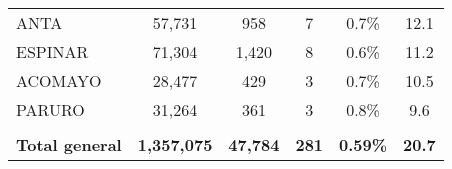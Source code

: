 \begin{tabular}{lccccc}
	\cellcolor[HTML]{FFFF99}ANTA                                    & 57,731               & 958                                  & 7                    & 0.7\%                      & 12.1                                        \\
	\cellcolor[HTML]{FFFF99}ESPINAR                                 & 71,304               & 1,420                                & 8                    & 0.6\%                      & 11.2                                        \\
	\cellcolor[HTML]{FFFF99}ACOMAYO                                 & 28,477               & 429                                  & 3                    & 0.7\%                      & 10.5                                        \\
	\cellcolor[HTML]{FFFF99}PARURO                                  & 31,264               & 361                                  & 3                    & 0.8\%                      & 9.6                                         \\
	& \multicolumn{1}{l}{} & \multicolumn{1}{l}{}                 & \multicolumn{1}{l}{} & \multicolumn{1}{l}{}       & \multicolumn{1}{l}{}                        \\
	\rowcolor[HTML]{DDEBF7} 
	\textbf{Total general}                                          & \textbf{1,357,075}   & \textbf{47,784}                      & \textbf{281}         & \textbf{0.59\%}            & \textbf{20.7}                              
\end{tabular}